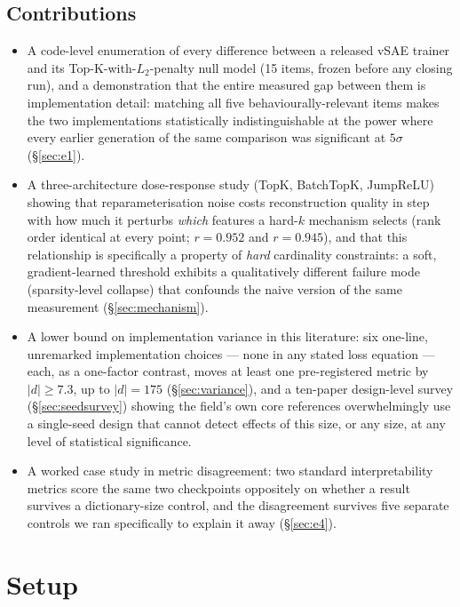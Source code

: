 \documentclass[11pt]{article}
\begin{document}
\subsection{Contributions}
\begin{itemize}
\item A code-level enumeration of every difference between a released vSAE
  trainer and its Top-K-with-$L_2$-penalty null model (15 items, frozen before
  any closing run), and a demonstration that the entire measured gap between
  them is implementation detail: matching all five behaviourally-relevant items makes
  the two implementations statistically indistinguishable at the power where
  every earlier generation of the same comparison was significant at
  $5\sigma$ (\S\ref{sec:e1}).
\item A three-architecture dose-response study (TopK, BatchTopK, JumpReLU)
  showing that reparameterisation noise costs reconstruction quality in
  step with how much it perturbs \emph{which} features a hard-$k$ mechanism
  selects (rank order identical at every point; $r=0.952$ and $r=0.945$), and
  that this
  relationship is specifically a property of \emph{hard} cardinality
  constraints: a soft, gradient-learned threshold exhibits a qualitatively
  different failure mode (sparsity-level collapse) that confounds the naive
  version of the same measurement (\S\ref{sec:mechanism}).
\item A lower bound on implementation variance in this literature: six
  one-line, unremarked implementation choices --- none in any stated
  loss equation --- each, as a one-factor contrast, moves at least one
  pre-registered metric by $|d|\ge7.3$, up to $|d|=175$
  (\S\ref{sec:variance}), and a ten-paper design-level survey
  (\S\ref{sec:seedsurvey}) showing the field's own core references
  overwhelmingly use a single-seed design that cannot detect effects of
  this size, or any size, at any level of statistical significance.
\item A worked case study in metric disagreement: two standard
  interpretability metrics score the same two checkpoints oppositely on
  whether a result survives a dictionary-size control, and the disagreement
  survives five separate controls we ran specifically to explain it away
  (\S\ref{sec:e4}).
\end{itemize}

\section{Setup}
\label{sec:setup}
\end{document}

